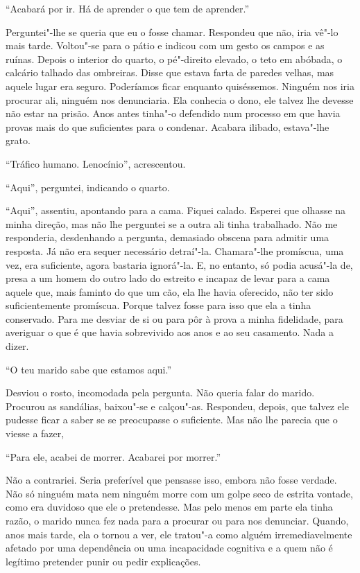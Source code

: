 ``Acabará por ir. Há de aprender o que tem de aprender.''

Perguntei"-lhe se queria que eu o fosse chamar. Respondeu que não, iria
vê"-lo mais tarde. Voltou"-se para o pátio e indicou com um gesto os
campos e as ruínas. Depois o interior do quarto, o pé"-direito elevado,
o teto em abóbada, o calcário talhado das ombreiras. Disse que estava
farta de paredes velhas, mas aquele lugar era seguro. Poderíamos ficar
enquanto quiséssemos. Ninguém nos iria procurar ali, ninguém nos
denunciaria. Ela conhecia o dono, ele talvez lhe devesse não estar na
prisão. Anos antes tinha"-o defendido num processo em que havia provas
mais do que suficientes para o condenar. Acabara ilibado, estava"-lhe
grato.

``Tráfico humano. Lenocínio'',
acrescentou.

``Aqui'',
perguntei, indicando o quarto.

``Aqui'',
assentiu, apontando para a cama. Fiquei calado. Esperei que olhasse na
minha direção, mas não lhe perguntei se a outra ali tinha trabalhado.
Não me responderia, desdenhando a pergunta, demasiado obscena para
admitir uma resposta. Já não era sequer necessário detraí"-la.
Chamara"-lhe promíscua, uma vez, era suficiente, agora bastaria
ignorá"-la. E, no entanto, só podia acusá"-la de, presa a um homem do
outro lado do estreito e incapaz de levar para a cama aquele que, mais
faminto do que um cão, ela lhe havia oferecido, não ter sido
suficientemente promíscua. Porque talvez fosse para isso que ela a tinha
conservado. Para me desviar de si ou para pôr à prova a minha
fidelidade, para averiguar o que é que havia sobrevivido aos anos e ao
seu casamento. Nada a dizer.

``O teu marido sabe que estamos aqui.''

Desviou o rosto, incomodada pela pergunta. Não queria falar do marido.
Procurou as sandálias, baixou"-se e calçou"-as. Respondeu, depois, que
talvez ele pudesse ficar a saber se se preocupasse o suficiente. Mas não
lhe parecia que o viesse a fazer,

``Para ele, acabei de morrer. Acabarei por morrer.''

Não a contrariei. Seria preferível que pensasse isso, embora não fosse
verdade. Não só ninguém mata nem ninguém morre com um golpe seco de
estrita vontade, como era duvidoso que ele o pretendesse. Mas pelo menos
em parte ela tinha razão, o marido nunca fez nada para a procurar ou
para nos denunciar. Quando, anos mais tarde, ela o tornou a ver, ele
tratou"-a como alguém irremediavelmente afetado por uma dependência ou
uma incapacidade cognitiva e a quem não é legítimo pretender punir ou
pedir explicações.

